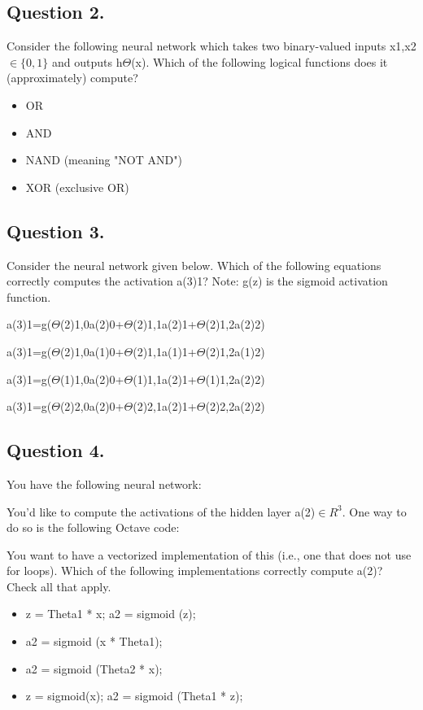 \documentclass[11pt]{article} %
\begin{document}
\subsection*{Question 2.} 
Consider the following neural network which takes two binary-valued inputs x1,x2 $\in \{0,1\}$ and outputs h$\Theta$(x). Which of the following logical functions does it (approximately) compute?

\begin{itemize}
	\item OR
	\item AND
	\item NAND (meaning "NOT AND")
	\item XOR (exclusive OR)
\end{itemize}





\subsection*{Question 3. }
Consider the neural network given below. Which of the following equations correctly computes the activation a(3)1? Note: g(z) is the sigmoid activation function.



a(3)1=g($\Theta$(2)1,0a(2)0+$\Theta$(2)1,1a(2)1+$\Theta$(2)1,2a(2)2)

a(3)1=g($\Theta$(2)1,0a(1)0+$\Theta$(2)1,1a(1)1+$\Theta$(2)1,2a(1)2)

a(3)1=g($\Theta$(1)1,0a(2)0+$\Theta$(1)1,1a(2)1+$\Theta$(1)1,2a(2)2)

a(3)1=g($\Theta$(2)2,0a(2)0+$\Theta$(2)2,1a(2)1+$\Theta$(2)2,2a(2)2)
\subsection*{Question 4. }
You have the following neural network:


You'd like to compute the activations of the hidden layer a(2)$\in R^3$. One way to do so is the following Octave code:


You want to have a vectorized implementation of this (i.e., one that does not use for loops). Which of the following implementations correctly compute a(2)? Check all that apply.

\begin{itemize}
\item z = Theta1 * x; a2 = sigmoid (z);

\item a2 = sigmoid (x * Theta1);

\item a2 = sigmoid (Theta2 * x);

\item z = sigmoid(x); a2 = sigmoid (Theta1 * z);
\end{itemize}
\end{document}
